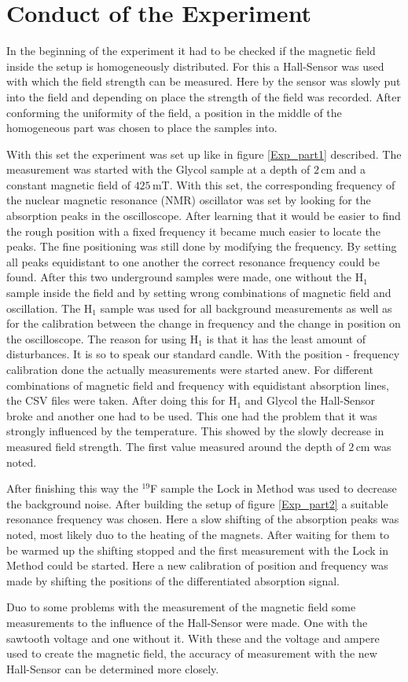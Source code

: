 \section{Conduct of the Experiment}
In the beginning of the experiment it had to be checked if the magnetic field inside the setup is homogeneously distributed. For this a Hall-Sensor was used with which the field strength can be measured. Here by the sensor was slowly put into the field and depending on place the strength of the field was recorded. After conforming the uniformity of the field, a position in the middle of the homogeneous part was chosen to place the samples into.\par
With this set the experiment was set up like in figure \ref{Exp_part1} described. The measurement was started with the  Glycol sample at a depth of $2$\,cm and a constant magnetic field of $425\,$mT. With this set, the corresponding frequency of the nuclear magnetic resonance (NMR) oscillator was set by looking for the absorption peaks in the oscilloscope. After learning that it would be easier to find the rough position with a fixed frequency it became much easier to locate the peaks. The fine positioning was still done by modifying the frequency. By setting all peaks equidistant to one another the correct resonance frequency could be found. After this two underground samples were made, one without the H$_1$ sample inside the field and by setting wrong combinations of magnetic field and oscillation. The H$_1$ sample was used for all background measurements as well as for the calibration between the change in frequency and the change in position on the oscilloscope. The reason for using H$_1$ is that it has the least amount of disturbances. It is so to speak our standard candle. With the position - frequency calibration done the actually measurements were started anew. For different combinations of magnetic field and frequency with equidistant absorption lines, the CSV files were taken. After doing this for H$_1$ and Glycol the Hall-Sensor broke and another one had to be used. This one had the problem that it was strongly influenced by the temperature. This showed by the slowly decrease in measured field strength. The first value measured around the depth of $2\,$cm was noted.\par 
After finishing this way the $^{19}$F sample the Lock in Method was used to decrease the background noise. After building the setup of figure \ref{Exp_part2} a suitable resonance frequency was chosen. Here a slow shifting of the absorption peaks was noted, most likely duo to the heating of the magnets. After waiting for them to be warmed up the shifting stopped and the first measurement with the Lock in Method could be started. Here a new calibration of position and frequency was made by shifting the positions of the differentiated absorption signal.\par
Duo to some problems with the measurement of the magnetic field some measurements to the influence of the Hall-Sensor were made. One with the sawtooth voltage and one without it. With these and the voltage and ampere used to create the magnetic field, the accuracy of measurement with the new Hall-Sensor can be determined more closely.